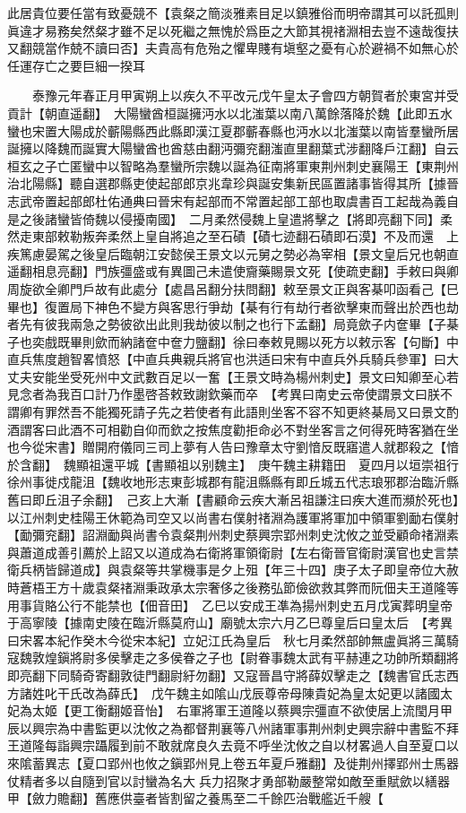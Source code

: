 此居貴位要任當有致憂競不【袁粲之簡淡雅素目足以鎮雅俗而明帝謂其可以託孤則眞違才易務矣然粲才雖不足以死繼之無愧於爲臣之大節其視禇淵相去豈不遠哉復扶又翻競當作兢不讀曰否】夫貴高有危殆之懼卑賤有塡壑之憂有心於避禍不如無心於任運存亡之要巨細一揆耳

　　泰豫元年春正月甲寅朔上以疾久不平改元戊午皇太子會四方朝賀者於東宮并受貢計【朝直遥翻】　大陽蠻酋桓誕擁沔水以北滍葉以南八萬餘落降於魏【此即五水蠻也宋置大陽成於蘄陽縣西此縣即漢江夏郡蘄春縣也沔水以北滍葉以南皆羣蠻所居誕擁以降魏而誕實大陽蠻酋也酋慈由翻沔彌兖翻滍直里翻葉式涉翻降戶江翻】自云桓玄之子亡匿蠻中以智略為羣蠻所宗魏以誕為征南將軍東荆州刺史襄陽王【東荆州治北陽縣】聽自選郡縣吏使起部郎京兆韋珍與誕安集新民區置諸事皆得其所【據晉志武帝置起部郎杜佑通典曰晉宋有起部而不常置起部工部也取虞書百工起哉為義自是之後諸蠻皆倚魏以侵擾南國】　二月柔然侵魏上皇遣將擊之【將即亮翻下同】柔然走東部敕勒叛奔柔然上皇自將追之至石磧【磧七迹翻石磧即石漠】不及而還　上疾篤慮晏駕之後皇后臨朝江安懿侯王景文以元舅之勢必為宰相【景文皇后兄也朝直遥翻相息亮翻】門族彊盛或有異圖己未遣使齎藥賜景文死【使疏吏翻】手敕曰與卿周旋欲全卿門戶故有此處分【處昌呂翻分扶問翻】敕至景文正與客棊叩函看己【巳畢也】復置局下神色不變方與客思行爭劫【棊有行有劫行者欲擊東而聲出於西也劫者先有彼我兩急之勢彼欲出此則我劫彼以制之也行下孟翻】局竟歛子内奩畢【子棊子也奕戲既畢則歛而納諸奩中奩力鹽翻】徐曰奉敕見賜以死方以敕示客【句斷】中直兵焦度趙智畧憤怒【中直兵典親兵將官也洪适曰宋有中直兵外兵騎兵參軍】曰大丈夫安能坐受死州中文武數百足以一奮【王景文時為楊州刺史】景文曰知卿至心若見念者為我百口計乃作墨啓荅敕致謝欽藥而卒　【考異曰南史云帝使謂景文曰朕不謂卿有罪然吾不能獨死請子先之若使者有此語則坐客不容不知更終棊局又曰景文酌酒謂客曰此酒不可相勸自仰而欽之按焦度勸拒命必不對坐客言之何得死時客猶在坐也今從宋書】贈開府儀同三司上夢有人告曰豫章太守劉愔反既寤遣人就郡殺之【愔於含翻】　魏顯祖還平城【書顯祖以别魏主】　庚午魏主耕籍田　夏四月以垣崇祖行徐州事徙戍龍沮【魏收地形志東彭城郡有龍沮縣縣有即丘城五代志琅邪郡治臨沂縣舊曰即丘沮子余翻】　己亥上大漸【書顧命云疾大漸呂祖謙注曰疾大進而瀕於死也】以江州刺史桂陽王休範為司空又以尚書右僕射禇淵為護軍將軍加中領軍劉勔右僕射【勔彌兖翻】詔淵勔與尚書令袁粲荆州刺史蔡興宗郢州刺史沈攸之並受顧命禇淵素與蕭道成善引薦於上詔又以道成為右衛將軍領衛尉【左右衛晉官衛尉漢官也史言禁衛兵柄皆歸道成】與袁粲等共掌機事是夕上殂【年三十四】庚子太子即皇帝位大赦時蒼梧王方十歲袁粲禇淵秉政承太宗奢侈之後務弘節儉欲救其弊而阮佃夫王道隆等用事貨賂公行不能禁也【佃音田】　乙巳以安成王凖為揚州刺史五月戊寅葬明皇帝于高寧陵【據南史陵在臨沂縣莫府山】廟號太宗六月乙巳尊皇后曰皇太后　【考異曰宋畧本紀作癸木今從宋本紀】立妃江氏為皇后　秋七月柔然部帥無盧眞將三萬騎寇魏敦煌鎭將尉多侯擊走之多侯眷之子也【尉眷事魏太武有平赫連之功帥所類翻將即亮翻下同騎奇寄翻敦徒門翻尉紆勿翻】又寇晉昌守將薛奴擊走之【魏書官氏志西方諸姓叱干氏改為薛氏】　戊午魏主如隂山戊辰尊帝母陳貴妃為皇太妃更以諸國太妃為太姬【更工衡翻姬音怡】　右軍將軍王道隆以蔡興宗彊直不欲使居上流閠月甲辰以興宗為中書監更以沈攸之為都督荆襄等八州諸軍事荆州刺史興宗辭中書監不拜王道隆每詣興宗躡履到前不敢就席良久去竟不呼坐沈攸之自以材畧過人自至夏口以來隂蓄異志【夏口郢州也攸之鎭郢州見上卷五年夏戶雅翻】及徙荆州擇郢州士馬器仗精者多以自隨到官以討蠻為名大兵力招聚才勇部勒嚴整常如敵至重賦歛以繕器甲【斂力贍翻】舊應供臺者皆割留之養馬至二千餘匹治戰艦近千艘【